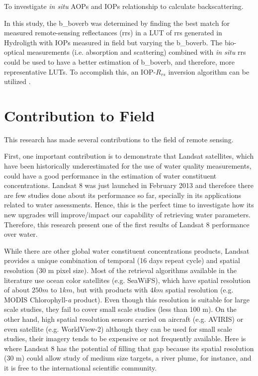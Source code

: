 \begin{enumerate}
			{\bf \item To investigate {\it in situ} AOPs and IOPs relationship to calculate backscattering.}

In this study, the \gls{b_boverb} was determined by finding the best match for measured remote-sensing reflectances (\acrshort{rrs}) in a LUT of \gls{rrs} generated in Hydroligth with IOPs measured in field but varying the \gls{b_boverb}. The bio-optical measurements (i.e. absorption and scattering) combined with {\it in situ} \gls{rrs} could be used to have a better estimation of \gls{b_boverb}, and therefore, more representative LUTs. To accomplish this, an IOP-$R_{rs}$ inversion algorithm can be utilized \citep{Morel:1977rw,Lee2002_invQAA,Werdell2013_inv}.	

	\end{enumerate}	

		

\section{Contribution to Field}
\label{sec:contributiontofield}
This research has made several contributions to the field of remote sensing.

First, one important contribution is to demonstrate that Landsat satellites, which have been historically underestimated for the use of water quality measurements, could have a good performance in the estimation of water constituent concentrations. Landsat 8 was just launched in February 2013 and therefore there are few studies done about its performance so far, specially in its applications related to water assessments. Hence, this is the perfect time to investigate how its new upgrades will improve/impact our capability of retrieving water parameters. Therefore, this research present one of the first results of Landsat 8 performance over water.  

While there are other global water constituent concentrations products, Landsat provides a unique combination of temporal (16 days repeat cycle) and spatial resolution (30 m pixel size). Most of the retrieval algorithms available in the literature use ocean color satellites (e.g. SeaWiFS), which have spatial resolution of about $250 m$ to $1 km$, but with products with $4km$ spatial resolution (e.g. MODIS Chlorophyll-{\it a} product). Even though this resolution is suitable for large scale studies, they fail to cover small scale studies (less than 100 m). On the other hand, high spatial resolution sensors carried on aircraft (e.g. AVIRIS) or even satellite (e.g. WorldView-2) although they can be used for small scale studies, their imagery tends to be expensive or not frequently available. Here is where Landsat 8 has the potential of filling that gap because its spatial resolution (30 m) could allow study of medium size targets, a river plume, for instance, and it is free to the international scientific community.

